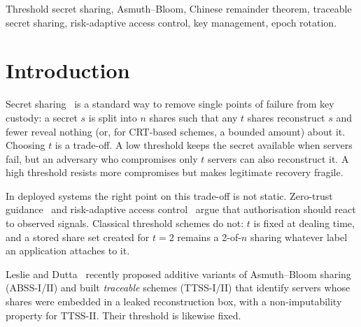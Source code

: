 \documentclass[conference]{IEEEtran}
\begin{document}
\begin{IEEEkeywords}
Threshold secret sharing, Asmuth--Bloom, Chinese remainder theorem, traceable secret sharing, risk-adaptive access control, key management, epoch rotation.
\end{IEEEkeywords}

\section{Introduction}
\label{sec:intro}

Secret sharing~\cite{shamir1979share,blakley1979safeguarding} is a standard way to remove single points of failure from key custody: a secret $s$ is split into $n$ shares such that any $t$ shares reconstruct $s$ and fewer reveal nothing (or, for CRT-based schemes, a bounded amount) about it. Choosing $t$ is a trade-off. A low threshold keeps the secret available when servers fail, but an adversary who compromises only $t$ servers can also reconstruct it. A high threshold resists more compromises but makes legitimate recovery fragile.

In deployed systems the right point on this trade-off is not static. Zero-trust guidance~\cite{rose2020zta} and risk-adaptive access control~\cite{mcgraw2009radac,cheng2007fuzzymls} argue that authorisation should react to observed signals. Classical threshold schemes do not: $t$ is fixed at dealing time, and a stored share set created for $t=2$ remains a 2-of-$n$ sharing whatever label an application attaches to it.

Leslie and Dutta~\cite{leslie2025traceable} recently proposed additive variants of Asmuth--Bloom sharing~\cite{asmuth1983modular} (ABSS-I/II) and built \emph{traceable} schemes (TTSS-I/II) that identify servers whose shares were embedded in a leaked reconstruction box, with a non-imputability property for TTSS-II. Their threshold is likewise fixed.
\end{document}
